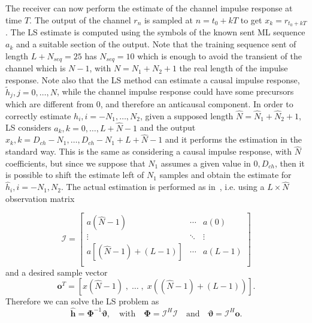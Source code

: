 \documentclass[10pt]{article}
\begin{document}
The receiver can now perform the estimate of the channel impulse response at time $T$. The output of the channel $r_n$ is sampled at $n = t_0 + kT$ to get $x_k = r_{t_0 + kT}$. The LS estimate is computed using the symbols of the known sent ML sequence $a_k$ and a suitable section of the output. Note that the training sequence sent of length $L + N_{seq} = 25$ has $N_{seq} = 10$ which is enough to avoid the transient of the channel which is $N - 1$, with $N = N_1 + N_2 + 1$ the real length of the impulse response.
Note also that the LS method can estimate a causal impulse response, $\tilde{h}_j, j = 0, \dots, N$, while the channel impulse response could have some precursors which are different from 0, and therefore an anticausal component. In order to correctly estimate $h_i, i = -N_1, \dots, N_2$, given a supposed length $\hat{N} = \hat{N}_1 + \hat{N}_2 + 1$, LS considers $a_k, k = 0, \dots, L+\hat{N}-1$ and the output $x_k, k = D_{ch} - N_1, \dots, D_{ch} - N_1 + L + \hat{N} - 1$ and it performs the estimation in the standard way. This is the same as considering a causal impulse response, with $\hat{N}$ coefficients, but since we suppose that $N_1$ assumes a given value in $0, D_{ch}$, then it is possible to shift the estimate left of $N_1$ samples and obtain the estimate for $\hat{h}_i, i = -N_1, N_2$. 
The actual estimation is performed as in~\cite[p.~246]{bc}, i.e. using a $L \times \hat{N}$ observation matrix

\begin{equation}
	\boldsymbol{\mathcal{I}} =
 \begin{bmatrix}
  a(\hat{N}-1) & \cdots & a(0) \\
  \vdots  & \ddots & \vdots  \\
a[(\hat{N}-1)+(L-1)] & \cdots & a(L-1) \\
 \end{bmatrix}
\end{equation}
and a desired sample vector
\begin{equation}
\mathbf{o}^T = \left[ x(\hat{N}-1)\;,\; \ldots\; , \;x((\hat{N}-1)+(L-1)) \right].
\end{equation}
Therefore we can solve the LS problem as
\begin{equation}
	\hat{\mathbf{h}}= \mathbf{\Phi}^{-1} \boldsymbol{\vartheta}, \quad\mathrm{ with } \quad \mathbf{\Phi}=\boldsymbol{\mathcal{I}}^H \boldsymbol{\mathcal{I}} \quad \mathrm{ and }\quad \boldsymbol{\vartheta} = \boldsymbol{\mathcal{I}}^H \mathbf{o}.
\end{equation}
\end{document}
